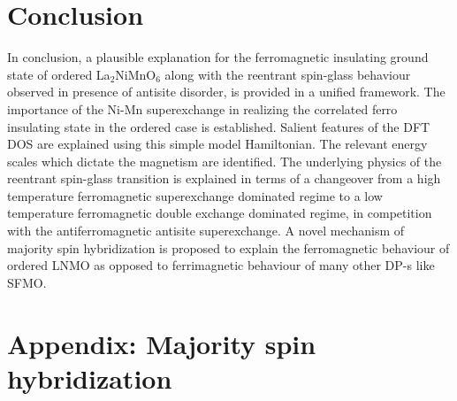 \documentclass[english,aps,prb,twocolumn,showpacs]{revtex4-1}
\begin{document}
\section{Conclusion}

In conclusion, a plausible explanation for the ferromagnetic insulating ground state of ordered La$_{2}$NiMnO$_{6}$ along
 with the reentrant spin-glass behaviour observed in presence of antisite disorder, is provided in a unified framework.
  The importance of the Ni-Mn superexchange
  in realizing the correlated ferro insulating state in the ordered case is established.
 Salient features of the DFT DOS are explained using this simple model Hamiltonian.
 The relevant energy scales which dictate the magnetism are identified. The underlying physics of the 
 reentrant spin-glass transition is explained in terms of a changeover from a high temperature ferromagnetic superexchange
 dominated regime to a low temperature ferromagnetic double exchange dominated regime, in competition
 with the antiferromagnetic antisite superexchange. 
  A novel mechanism of majority spin
 hybridization is proposed to explain the ferromagnetic behaviour of ordered LNMO as opposed to ferrimagnetic behaviour of
 many other DP-s like SFMO. 

\section{Appendix: Majority spin hybridization}
\end{document}
